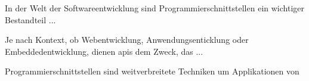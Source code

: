 In der Welt der Softwareentwicklung sind Programmierschnittstellen ein wichtiger Bestandteil ...

Je nach Kontext, ob Webentwicklung, Anwendungsenticklung oder Embeddedentwicklung, dienen \gls{api}s dem Zweck, das ...

Programmierschnittstellen sind weitverbreitete Techniken um Applikationen von

